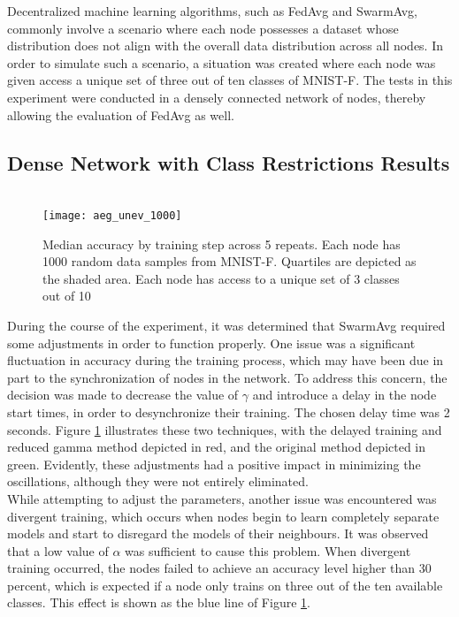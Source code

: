 Decentralized machine learning algorithms, such as FedAvg and SwarmAvg, commonly involve a scenario where each node possesses a dataset whose distribution does not align with the overall data distribution across all nodes. In order to simulate such a scenario, a situation was created where each node was given access a unique set of three out of ten classes of MNIST-F. The tests in this experiment were conducted in a densely connected network of nodes, thereby allowing the evaluation of FedAvg as well.

\subsection{Dense Network with Class Restrictions Results}

\begin{figure}[H] 
	 \\
	\texttt{[image: aeg\_unev\_1000]}
	\caption{Median accuracy by training step across 5 repeats. Each node has 1000 random data samples from MNIST-F. Quartiles are depicted as the shaded area. Each node has access to a unique set of 3 classes out of 10}
	\label{aeg7}
\end{figure}

During the course of the experiment, it was determined that SwarmAvg required some adjustments in order to function properly. One issue was a significant fluctuation in accuracy during the training process, which may have been due in part to the synchronization of nodes in the network. To address this concern, the decision was made to decrease the value of $\gamma$ and introduce a delay in the node start times, in order to desynchronize their training. The chosen delay time was 2 seconds. Figure \ref{aeg7} illustrates these two techniques, with the delayed training and reduced gamma method depicted in red, and the original method depicted in green. Evidently, these adjustments had a positive impact in minimizing the oscillations, although they were not entirely eliminated. \\

While attempting to adjust the parameters, another issue was encountered was divergent training, which occurs when nodes begin to learn completely separate models and start to disregard the models of their neighbours. It was observed that a low value of $\alpha$ was sufficient to cause this problem. When divergent training occurred, the nodes failed to achieve an accuracy level higher than 30 percent, which is expected if a node only trains on three out of the ten available classes. This effect is shown as the blue line of Figure \ref{aeg7}. \\

